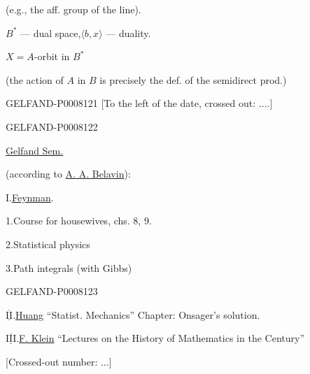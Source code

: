 (e.g., the aff. group of the line).

\(B^*\) — dual space,\qquad \(\langle b,x\rangle\) — duality.

\(X=A\)-orbit in \(B^*\)

(the action of \(A\) in \(B\) is precisely the def. of the semidirect prod.)


\begin{GelfandAdjacentEvidence}{GELFAND-P000812}{1}
[To the left of the date, crossed out: \(\ldots\).]
\end{GelfandAdjacentEvidence}
\begin{GelfandAdjacentEvidence}{GELFAND-P000812}{2}


\qquad \uline{Gelfand Sem.}

 (according to \uline{A. A. Belavin}):

I.\quad \uline{Feynman}.

\hspace{1em}1.\quad Course for housewives, chs. 8, 9.

\hspace{1em}2.\quad Statistical physics

\hspace{1em}3.\quad Path integrals (with Gibbs)
\end{GelfandAdjacentEvidence}
\begin{GelfandAdjacentEvidence}{GELFAND-P000812}{3}


\(\overline{\underline{\mathrm{II}}}\).\quad \uline{Huang} “Statist. Mechanics” Chapter: Onsager’s solution.

\(\overline{\underline{\mathrm{III}}}\).\quad \uline{F. Klein} “Lectures on the History of Mathematics in the  Century”

[Crossed-out number: \(\ldots\)]
\end{GelfandAdjacentEvidence}
